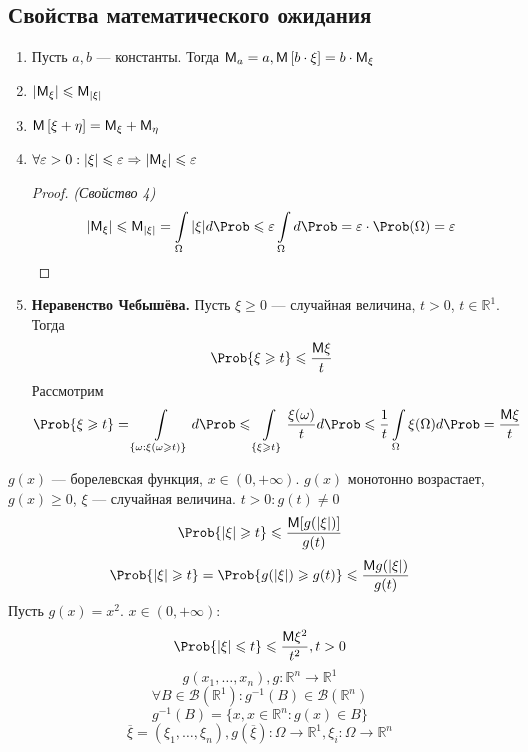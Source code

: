 \subsection{Свойства математического ожидания}
\begin{enumerate}
  \item Пусть $a, b$ --- константы. Тогда $\mathsf{M}_a = a, \mathsf{M} \left[ b \cdot \xi \right] = b \cdot \mathsf{M}_{\xi}$
  \item $|\mathsf{M}_{\xi}| \leqslant \mathsf{M}_{|\xi|}$
  \item $\mathsf{M} \left[ \xi + \eta \right] = \mathsf{M}_{\xi} + \mathsf{M}_{\eta}$
  \item $\forall \varepsilon > 0 : |\xi| \leqslant \varepsilon \Rightarrow |\mathsf{M}_{\xi}| \leqslant \varepsilon$
  \begin{proof} \textit{(Свойство 4)}
    \[
      |\MExpect_{\xi}| \leqslant \MExpect_{|\xi|} = \int\limits_{\Omega} |\xi| d \Prob \leqslant \varepsilon \int\limits_{\Omega} d \Prob = \varepsilon \cdot \Prob(\Omega) = \varepsilon
    \]
  \end{proof}
  \item \textbf{Неравенство Чебышёва.} Пусть $\xi \geqslant 0$ --- случайная величина, $t > 0$, $t \in \mathbb{R}^1$. Тогда
  \[
    \Prob \{ \xi \geqslant t \} \leqslant \frac{\MExpect \xi}{t}
  \]
  Рассмотрим
  \[
    \Prob \{ \xi \geqslant t \} = \int\limits_{\{ \omega: \xi(\omega \geqslant t)\}} d \Prob \leqslant \int\limits_{\{ \xi \geqslant t \}} \frac{\xi(\omega)}{t} d \Prob \leqslant \frac{1}{t} \int\limits_{\Omega} \xi(\Omega) d \Prob = \frac{\MExpect \xi}{t}
  \]
\end{enumerate}
\begin{conclusion}
  $g(x)$ --- борелевская функция, $x \in (0, +\infty)$. $g(x)$ монотонно возрастает, $g(x) \geqslant 0$, $\xi$ --- случайная величина. $t > 0: g(t) \not= 0$
  \[
    \Prob \{ |\xi| \geqslant t \} \leqslant \frac{\MExpect [g(|\xi|)]}{g(t)}
  \]
  \[
    \Prob \{ |\xi| \geqslant t \} = \Prob \{ g(|\xi|) \geqslant g(t) \} \leqslant \frac{\MExpect g(|\xi|)}{g(t)}
  \]
  Пусть $g(x) = x^2$. $x \in (0, +\infty)$:
  \[
    \Prob \{ |\xi| \leqslant t \} \leqslant \frac{\MExpect \xi^2}{t^2}, t > 0
  \]
  \[
    g(x_1, \ldots, x_n), g: \mathbb{R}^n \to \mathbb{R}^1
  \]
  \[
    \forall B \in \mathcal{B} (\mathbb{R}^1) : g^{-1}(B) \in \mathcal{B} (\mathbb{R}^n)
  \]
  \[
    g^{-1} (B) = \{ x, x \in \mathbb{R}^n : g(x) \in B \}
  \]
  \[
    \overline{\xi} = (\xi_1, \ldots, \xi_n), g(\overline{\xi}) : \Omega \to \mathbb{R}^1, \xi_i: \Omega \to \mathbb{R}^n
  \]
\end{conclusion}
